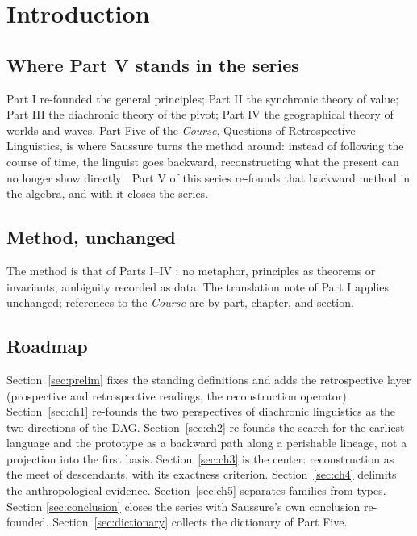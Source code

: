 \documentclass[11pt,a4paper]{article}
\theoremstyle{remark}
\begin{document}
\section{Introduction}
\label{sec:intro}

\subsection{Where Part V stands in the series}

Part I \cite{part1} re-founded the general principles; Part II \cite{part2}
the synchronic theory of value; Part III \cite{part3} the diachronic theory
of the pivot; Part IV \cite{part4} the geographical theory of worlds and
waves. Part Five of the \textit{Course}, Questions of Retrospective
Linguistics, is where Saussure turns the method around: instead of following
the course of time, the linguist goes backward, reconstructing what the
present can no longer show directly \cite[Part V]{harris1983}. Part V of this
series re-founds that backward method in the algebra, and with it closes the
series.

\subsection{Method, unchanged}

The method is that of Parts I--IV \cite{part1,part2,part3,part4}: no
metaphor, principles as theorems or invariants, ambiguity recorded as data.
The translation note of Part I applies unchanged; references to the
\textit{Course} are by part, chapter, and section.

\subsection{Roadmap}

Section~\ref{sec:prelim} fixes the standing definitions and adds the
retrospective layer (prospective and retrospective readings, the
reconstruction operator). Section~\ref{sec:ch1} re-founds the two
perspectives of diachronic linguistics as the two directions of the DAG.
Section~\ref{sec:ch2} re-founds the search for the earliest language and the
prototype as a backward path along a perishable lineage, not a projection
into the first basis. Section~\ref{sec:ch3} is the
center: reconstruction as the meet of descendants, with its exactness
criterion. Section~\ref{sec:ch4} delimits the anthropological evidence.
Section~\ref{sec:ch5} separates families from types. Section
\ref{sec:conclusion} closes the series with Saussure's own conclusion
re-founded. Section~\ref{sec:dictionary} collects the dictionary of Part
Five.
\end{document}
